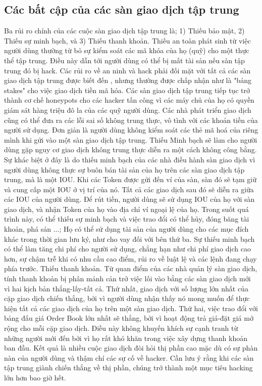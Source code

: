 \documentclass[12pt,a4paper]{article}
\begin{document}
\begin{multicols}{2}
\subsection{Các bất cập của các sàn giao dịch tập trung}
Ba rủi ro chính của các cuộc sàn giao dịch tập trung là; 1) Thiếu bảo mật, 2) Thiếu sự minh bạch, và 3) Thiếu thanh khoản.
Thiếu an toàn phát sinh từ việc người dùng thường từ bỏ sự kiểm soát các mã khóa của họ (quỹ) cho một thực thể tập trung. Điều này dẫn tới người dùng có thể bị mất tài sản nếu sàn tập trung đó bị hack. Các rủi ro về an ninh và hack phải đối mặt với tất cả các sàn giao dịch tập trung được biết đến \cite{buterin2017ethereum} \cite{wood2014ethereum}, nhưng thường được chấp nhận như là "bảng stakes" cho việc giao dịch tiền mã hóa. Các sàn giao dịch tập trung tiếp tục trở thành cơ chế honeypots cho các hacker tấn công vì các máy chủ của họ có quyền giám sát hàng triệu đô la của các quỹ người dùng. Các nhà phát triển giao dịch cũng có thể đưa ra các lỗi sai số không trung thực, vô tình với các khoản tiền của người sử dụng. Đơn giản là người dùng không kiểm soát các thẻ mã hoá của riêng mình khi gửi vào một sàn giao dịch tập trung.
Thiếu Minh bạch sẽ làm cho người dùng gặp nguy cơ giao dịch không trung thực diễn ra một cách không công bằng. Sự khác biệt ở đây là do thiếu minh bạch của các nhà điều hành sàn giao dịch vì người dùng không thực sự buôn bán tài sản của họ trên các sàn giao dịch tập trung, mà là một IOU. Khi các Token được gửi đến ví của sàn, sàn đó sẽ tạm giữ và cung cấp một IOU ở vị trí của nó. Tất cả các giao dịch sau đó sẽ diễn ra giữa các IOU của người dùng. Để rút tiền, người dùng sẽ sử dụng IOU của họ với sàn giao dịch, và nhận Token của họ vào địa chỉ ví ngoại lệ của họ. Trong suốt quá trình này, có thể thiếu sự minh bạch và việc trao đổi có thể hủy, đóng băng tài khoản, phá sản ...; Họ có thể sử dụng tài sản của người dùng cho các mục đích khác trong thời gian lưu ký, như cho vay đối với bên thứ ba. Sự thiếu minh bạch có thể làm tăng chi phí cho người sử dụng, chẳng hạn như chi phí giao dịch cao hơn, sự chậm trễ khi có nhu cầu cao điểm, rủi ro về luật lệ và các lệnh đang chạy phía trước.
Thiếu thanh khoản. Từ quan điểm của các nhà quản lý sàn giao dịch, tính thanh khoản bị phân mảnh cản trở việc lối vào bằng các sàn giao dịch mới vì hai kịch bản thắng-lấy-tất cả. Thứ nhất, giao dịch với số lượng lớn nhất của cặp giao dịch chiến thắng, bởi vì người dùng nhận thấy nó mong muốn để thực hiện tất cả các giao dịch của họ trên một sàn giao dịch. Thứ hai, việc trao đổi với bảng đấu giá Order Book lớn nhất sẽ thắng, bởi vì hoạt động trả giá-đặt giá mở rộng cho mỗi cặp giao dịch. Điều này không khuyến khích sự cạnh tranh từ những người mới đến bởi vì họ rất khó khăn trong việc xây dựng thanh khoản ban đầu. Kết quả là nhiều cuộc giao dịch đòi hỏi thị phần cao mặc dù có sự phàn nàn của người dùng và thậm chí các sự cố về hacker. Cần lưu ý rằng khi các sàn tập trung giành chiến thắng về thị phần, chúng trở thành một mục tiêu hacking lớn hơn bao giờ hết.

\end{multicols}
\end{document}
